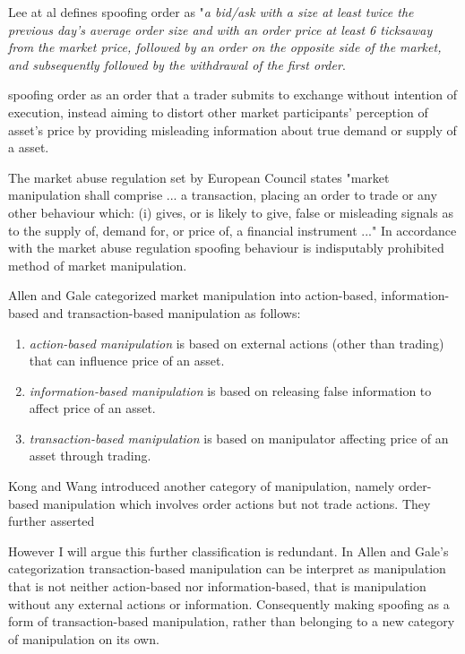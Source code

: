 \documentclass{tut-thesis}
\begin{document}
Lee at al \parencite*{} defines spoofing order as "\textit{a bid/ask with a size at least twice the previous day’s average order size and with an order price at least 6 ticks\footnotemark away from the market price, followed by an order on the opposite side of the market, and subsequently followed by the withdrawal of the first order}.


spoofing order as an order that a trader submits to exchange without intention of execution, instead aiming to distort other market participants' perception of asset's price by providing misleading information about true demand or supply of a asset. 


The market abuse regulation set by European Council states "market manipulation shall comprise ... a transaction, placing an order to trade or any other behaviour which: (i) gives, or is likely to give, false or misleading signals as to the supply of, demand for, or price of, a financial instrument ..." \autocite{EU-596-2014} In accordance with the market abuse regulation spoofing behaviour is indisputably prohibited method of market manipulation.

Allen and Gale categorized market manipulation into action-based, information-based and transaction-based manipulation as follows:
\begin{enumerate}
	\item \textit{action-based manipulation} is based on external actions (other than trading) that can influence price of an asset.
	\item \textit{information-based manipulation} is based on releasing false information to affect price of an asset.
	\item \textit{transaction-based manipulation}	is based on manipulator affecting price of an asset through trading.\autocite*{AllenGale1992}
\end{enumerate}

Kong and Wang \cite*{KongWang2013} introduced another category of manipulation, namely order-based manipulation which involves order actions but not trade actions. They further asserted 

However I will argue this further classification is redundant. In Allen and Gale's categorization transaction-based manipulation can be interpret as manipulation that is not neither action-based nor information-based, that is manipulation without any external actions or information. Consequently making spoofing as a form of transaction-based manipulation, rather than belonging to a new category of manipulation on its own.
\end{document}
